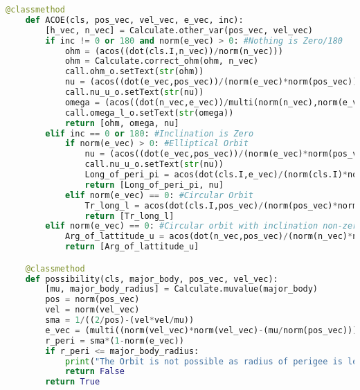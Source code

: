 \begin{lstlisting}[language=python, caption=CoOE.py]
    @classmethod
    def ACOE(cls, pos_vec, vel_vec, e_vec, inc):
        [h_vec, n_vec] = Calculate.other_var(pos_vec, vel_vec)
        if inc != 0 or 180 and norm(e_vec) > 0: #Nothing is Zero/180
            ohm = (acos((dot(cls.I,n_vec))/norm(n_vec)))
            ohm = Calculate.correct_ohm(ohm, n_vec)
            call.ohm_o.setText(str(ohm))
            nu = (acos((dot(e_vec,pos_vec))/(norm(e_vec)*norm(pos_vec))))
            call.nu_u_o.setText(str(nu))
            omega = (acos((dot(n_vec,e_vec))/multi(norm(n_vec),norm(e_vec))))
            call.omega_l_o.setText(str(omega))
            return [ohm, omega, nu]
        elif inc == 0 or 180: #Inclination is Zero
            if norm(e_vec) > 0: #Elliptical Orbit
                nu = (acos((dot(e_vec,pos_vec))/(norm(e_vec)*norm(pos_vec))))
                call.nu_u_o.setText(str(nu))
                Long_of_peri_pi = acos(dot(cls.I,e_vec)/(norm(cls.I)*norm(e_vec)))
                return [Long_of_peri_pi, nu]
            elif norm(e_vec) == 0: #Circular Orbit
                Tr_long_l = acos(dot(cls.I,pos_vec)/(norm(pos_vec)*norm(cls.I)))
                return [Tr_long_l]
        elif norm(e_vec) == 0: #Circular orbit with inclination non-zero/pi
            Arg_of_lattitude_u = acos(dot(n_vec,pos_vec)/(norm(n_vec)*norm(pos_vec)))
            return [Arg_of_lattitude_u]

    @classmethod
    def possibility(cls, major_body, pos_vec, vel_vec):
        [mu, major_body_radius] = Calculate.muvalue(major_body)
        pos = norm(pos_vec)
        vel = norm(vel_vec)
        sma = 1/((2/pos)-(vel*vel/mu))
        e_vec = (multi((norm(vel_vec)*norm(vel_vec)-(mu/norm(pos_vec))),pos_vec)- multi(dot(pos_vec,vel_vec),vel_vec))/(mu)
        r_peri = sma*(1-norm(e_vec))
        if r_peri <= major_body_radius:
            print("The Orbit is not possible as radius of perigee is less than radius of the major Body")
            return False
        return True
\end{lstlisting}